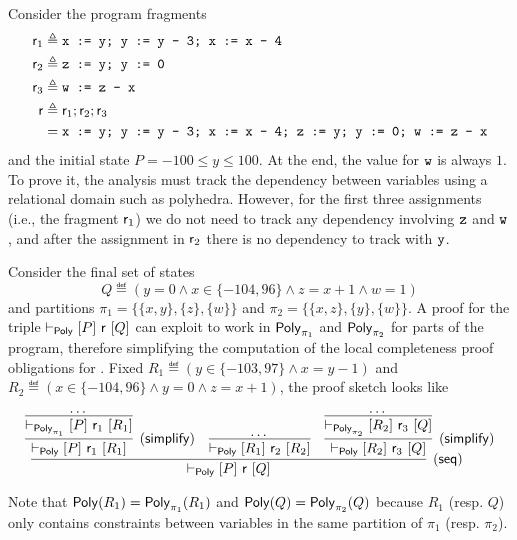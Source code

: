 \begin{example}
	Consider the program fragments
	\begin{align*}
		\mathsf{r}_1 & \triangleq \texttt{x := y; y := y - 3; x := x - 4}                        \\
		\mathsf{r}_2 & \triangleq \texttt{z := y; y := 0}                                        \\
		\mathsf{r}_3 & \triangleq \texttt{w := z - x}                                            \\
		\mathsf{r}   & \triangleq \mathsf{r}_1; \mathsf{r}_2; \mathsf{r}_3                                    \\
		        & = \texttt{x := y; y := y - 3; x := x - 4; z := y; y := 0; w := z - x}
	\end{align*}
	and the initial state $P = -100 \le y \le 100$. At the end, the value for $\texttt{w}$ is always $1$. To prove it, the analysis must track the dependency between variables using a relational domain such as polyhedra. However, for the first three assignments (i.e., the fragment $\mathsf{r}_1$) we do not need to track any dependency involving $\texttt{z}$ and $\texttt{w}$, and after the assignment  in $\mathsf{r}_2$ there is no dependency to track with $\texttt{y}$.

	Consider the final set of states
	\[
	Q \eqdef (y = 0 \land x \in \{ -104, 96 \} \land z = x + 1 \land w = 1)
	\]
	and partitions $\pi_1 = \{ \{ x , y \}, \{ z \}, \{ w \} \}$ and $\pi_2 = \{ \{ x, z \}, \{ y \}, \{ w \} \}$.
	A proof for the triple $\vdash_{\mathsf{Poly}}\nobreak[P]~\mathsf{r}~[Q]$ can exploit  to work in $\mathsf{Poly}_{\pi_1}$ and $\mathsf{Poly}_{\pi_2}$ for parts of the program, therefore simplifying the computation of the local completeness proof obligations for . Fixed $R_1 \eqdef (y \in \{ -103, 97 \} \land x = y - 1)$ and $R_2 \eqdef (x \in \{ -104, 96 \} \land y = 0 \land z = x + 1)$, the proof sketch looks like

	\[
	\infer[\lclrule{seq}]
	{\lcl{\Poly}{P}{\regr}{Q}}
	{
		\infer[\lclrule{simplify}]
		{\lcl{\Poly}{P}{\regr_1}{R_1}}
		{\infer{\lcl{\Poly_{\pi_1}}{P}{\regr_1}{R_1}}{\dots}}
		&
		\infer{\lcl{\Poly}{R_1}{\regr_2}{R_2}}{\dots}
		&
		\infer[\lclrule{simplify}]
		{\lcl{\Poly}{R_2}{\regr_3}{Q}}
		{\infer{\lcl{\Poly_{\pi_2}}{R_2}{\regr_3}{Q}}{\dots}}
	}
	\]

	Note that $\mathsf{Poly}(R_1) = \mathsf{Poly}_{\pi_1}(R_1)$ and $\mathsf{Poly}(Q) = \mathsf{Poly}_{\pi_2}(Q)$ because $R_1$ (resp. $Q$) only contains constraints between variables in the same partition of $\pi_1$ (resp. $\pi_2$).
\end{example}

